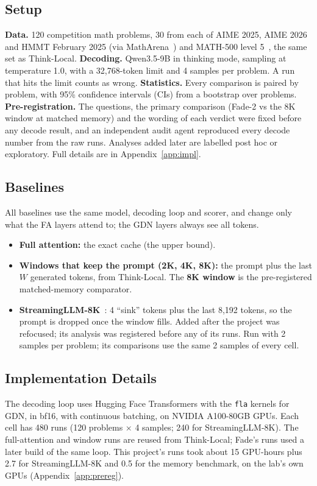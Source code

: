 \documentclass{article}
\begin{document}
\subsection{Setup}
\vspace{-0.3em}
\textbf{Data.} 120 competition math problems, 30 from each of AIME 2025, AIME 2026 and HMMT February 2025 (via MathArena~\cite{matharena}) and MATH-500 level 5~\cite{hendrycksmath,math500}, the same set as Think-Local. \textbf{Decoding.} Qwen3.5-9B in thinking mode, sampling at temperature 1.0, with a 32,768-token limit and 4 samples per problem. A run that hits the limit counts as wrong. \textbf{Statistics.} Every comparison is paired by problem, with 95\% confidence intervals (CIs) from a bootstrap over problems. \textbf{Pre-registration.} The questions, the primary comparison (Fade-2 vs the 8K window at matched memory) and the wording of each verdict were fixed before any decode result, and an independent audit agent reproduced every decode number from the raw runs. Analyses added later are labelled post hoc or exploratory. Full details are in Appendix~\ref{app:impl}.

\subsection{Baselines}
\vspace{-0.3em}
All baselines use the same model, decoding loop and scorer, and change only what the FA layers attend to; the GDN layers always see all tokens.
\begin{itemize}\setlength{\itemsep}{1pt}\setlength{\topsep}{0pt}
\item \textbf{Full attention:} the exact cache (the upper bound).
\item \textbf{Windows that keep the prompt (2K, 4K, 8K):} the prompt plus the last $W$ generated tokens, from Think-Local. The \textbf{8K window} is the pre-registered matched-memory comparator.
\item \textbf{StreamingLLM-8K}~\cite{streamingllm}: 4 ``sink'' tokens plus the last 8,192 tokens, so the prompt is dropped once the window fills. Added after the project was refocused; its analysis was registered before any of its runs. Run with 2 samples per problem; its comparisons use the same 2 samples of every cell.
\end{itemize}

\subsection{Implementation Details}
\vspace{-0.3em}
The decoding loop uses Hugging Face Transformers with the \texttt{fla} kernels for GDN, in bf16, with continuous batching, on NVIDIA A100-80GB GPUs. Each cell has 480 runs (120 problems $\times$ 4 samples; 240 for StreamingLLM-8K). The full-attention and window runs are reused from Think-Local; Fade's runs used a later build of the same loop. This project's runs took about 15 GPU-hours plus 2.7 for StreamingLLM-8K and 0.5 for the memory benchmark, on the lab's own GPUs (Appendix~\ref{app:prereg}).
\end{document}
